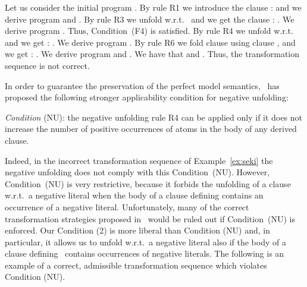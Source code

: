 \documentclass[english]{tlp}
\begin{document}
\begin{example}
\label{ex:seki} Let us consider the initial program  .
By rule R1 we introduce the clause 
:  
and we derive program  and . 
By rule R3 we unfold  w.r.t.~ and we get the clause
: .
We derive program . Thus, Condition~(F4) is satisfied.
By rule R4 we unfold   w.r.t.~
and we get 
: .
We derive program .
By rule R6 we fold clause  using clause , and we get 
: . 
\noindent
We derive program  and . We have that  and .  Thus, the 
transformation sequence  is not correct.
\end{example}

In order to guarantee the preservation of the perfect model
semantics,~\cite{Sek09} has proposed the following stronger
applicability condition for negative unfolding:

\smallskip \noindent
{\em{Condition}} (NU):
the negative unfolding rule R4 can be applied only if it does not
increase the number of positive occurrences of atoms in
the body of any derived clause. 

\smallskip \noindent
Indeed, in the incorrect transformation
sequence of Example~\ref{ex:seki} the negative unfolding does not
comply with this Condition~(NU).
However, Condition~(NU) is very restrictive, because it forbids  the
unfolding of a clause w.r.t.~a negative literal  when
 the body of a clause defining  contains an occurrence of a
negative literal. Unfortunately, many of the correct
transformation strategies proposed in~\cite{PeP00a,Fi&04a} would be
ruled out if Condition~(NU) is enforced. Our Condition (2) is more
liberal than Condition (NU) and, in particular, it allows us to
unfold w.r.t.~a negative literal  also if the body of a
clause defining~ contains occurrences of negative literals.
The following is an example of a correct, admissible transformation 
sequence which violates Condition (NU).
\end{document}
